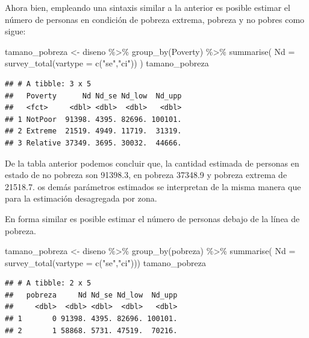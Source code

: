 \documentclass[
  12pt,
]{book}
\newenvironment{Shaded}{\begin{snugshade}}{\end{snugshade}}
\newcommand{\AttributeTok}[1]{\textcolor[rgb]{0.77,0.63,0.00}{#1}}
\newcommand{\FunctionTok}[1]{\textcolor[rgb]{0.00,0.00,0.00}{#1}}
\newcommand{\NormalTok}[1]{#1}
\newcommand{\OtherTok}[1]{\textcolor[rgb]{0.56,0.35,0.01}{#1}}
\newcommand{\SpecialCharTok}[1]{\textcolor[rgb]{0.00,0.00,0.00}{#1}}
\newcommand{\StringTok}[1]{\textcolor[rgb]{0.31,0.60,0.02}{#1}}
\begin{document}
Ahora bien, empleando una sintaxis similar a la anterior es posible estimar el número de personas en condición de pobreza extrema, pobreza y no pobres como sigue:

\begin{Shaded}
\begin{Highlighting}[]
\NormalTok{tamano\_pobreza }\OtherTok{\textless{}{-}}\NormalTok{ diseno }\SpecialCharTok{\%\textgreater{}\%} \FunctionTok{group\_by}\NormalTok{(Poverty) }\SpecialCharTok{\%\textgreater{}\%} 
                  \FunctionTok{summarise}\NormalTok{( }\AttributeTok{Nd =} \FunctionTok{survey\_total}\NormalTok{(}\AttributeTok{vartype =} \FunctionTok{c}\NormalTok{(}\StringTok{"se"}\NormalTok{,}\StringTok{"ci"}\NormalTok{)) )}
\NormalTok{tamano\_pobreza}
\end{Highlighting}
\end{Shaded}

\begin{verbatim}
## # A tibble: 3 x 5
##   Poverty      Nd Nd_se Nd_low  Nd_upp
##   <fct>     <dbl> <dbl>  <dbl>   <dbl>
## 1 NotPoor  91398. 4395. 82696. 100101.
## 2 Extreme  21519. 4949. 11719.  31319.
## 3 Relative 37349. 3695. 30032.  44666.
\end{verbatim}

De la tabla anterior podemos concluir que, la cantidad estimada de personas en estado de no pobreza son 91398.3, en pobreza 37348.9 y pobreza extrema de 21518.7. os demás parámetros estimados se interpretan de la misma manera que para la estimación desagregada por zona.

En forma similar es posible estimar el número de personas debajo de la línea de pobreza.

\begin{Shaded}
\begin{Highlighting}[]
\NormalTok{tamano\_pobreza }\OtherTok{\textless{}{-}}\NormalTok{ diseno }\SpecialCharTok{\%\textgreater{}\%} 
                  \FunctionTok{group\_by}\NormalTok{(pobreza) }\SpecialCharTok{\%\textgreater{}\%} 
                  \FunctionTok{summarise}\NormalTok{(}
                  \AttributeTok{Nd =} \FunctionTok{survey\_total}\NormalTok{(}\AttributeTok{vartype =} \FunctionTok{c}\NormalTok{(}\StringTok{"se"}\NormalTok{,}\StringTok{"ci"}\NormalTok{)))}
\NormalTok{tamano\_pobreza}
\end{Highlighting}
\end{Shaded}

\begin{verbatim}
## # A tibble: 2 x 5
##   pobreza     Nd Nd_se Nd_low  Nd_upp
##     <dbl>  <dbl> <dbl>  <dbl>   <dbl>
## 1       0 91398. 4395. 82696. 100101.
## 2       1 58868. 5731. 47519.  70216.
\end{verbatim}
\end{document}
